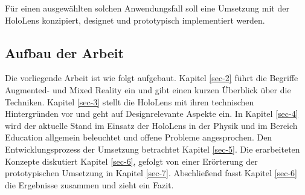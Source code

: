 \par
Für einen ausgewählten solchen Anwendungsfall soll eine Umsetzung mit der HoloLens konzipiert, designet und prototypisch implementiert werden.

\subsection{Aufbau der Arbeit}
\label{sec-1-2}
Die vorliegende Arbeit ist wie folgt aufgebaut. Kapitel \ref{sec-2} führt die Begriffe Augmented- und Mixed Reality ein und gibt einen kurzen Überblick über die Techniken. Kapitel \ref{sec-3} stellt die HoloLens mit ihren technischen Hintergründen vor und geht auf Designrelevante Aspekte ein. In Kapitel \ref{sec-4} wird der aktuelle Stand im Einsatz der HoloLens in der Physik und im Bereich Education allgemein beleuchtet und offene Probleme angesprochen. Den Entwicklungsprozess der Umsetzung betrachtet Kapitel \ref{sec-5}. Die erarbeiteten Konzepte diskutiert Kapitel \ref{sec-6}, gefolgt von einer Erörterung der prototypischen Umsetzung in Kapitel \ref{sec-7}. Abschließend fasst Kapitel \ref{sec-6} die Ergebnisse zusammen und zieht ein Fazit.